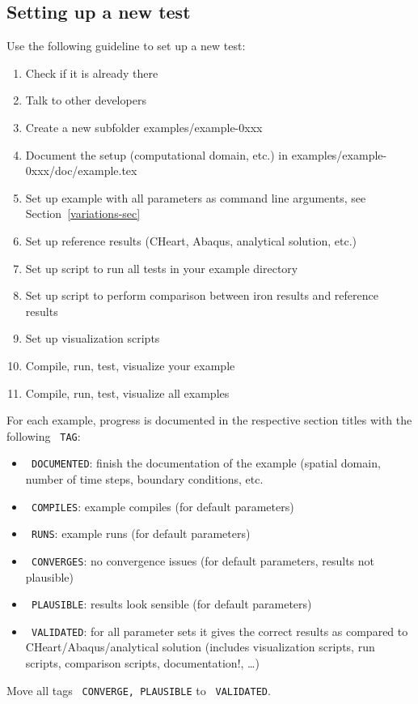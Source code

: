 \subsection{Setting up a new test}
%
Use the following guideline to set up a new test:
%
\begin{enumerate}
    \item Check if it is already there
    \item Talk to other developers
    \item Create a new subfolder examples/example-0xxx
    \item Document the setup (computational domain, etc.) in examples/example-0xxx/doc/example.tex
    \item Set up example with all parameters as command line arguments, see Section~\ref{variations-sec}
    \item Set up reference results (CHeart, Abaqus, analytical solution, etc.)
    \item Set up script to run all tests in your example directory
    \item Set up script to perform comparison between iron results and reference results
    \item Set up visualization scripts
    \item Compile, run, test, visualize your example
    \item Compile, run, test, visualize all examples
\end{enumerate}
%
For each example, progress is documented in the respective section titles
with the following \texttt{\color{red} TAG}:
%
\begin{itemize}
    \item{\texttt{\color{red} DOCUMENTED}: finish the documentation of the example (spatial domain, number of time steps, boundary conditions, etc.}
    \item{\texttt{\color{red} COMPILES}: example compiles (for default parameters)}
    \item{\texttt{\color{red} RUNS}: example runs (for default parameters)}
    \item{\texttt{\color{red} CONVERGES}: no convergence issues (for default parameters, results not plausible)}
    \item{\texttt{\color{red} PLAUSIBLE}: results look sensible (for default parameters)}
    \item{\texttt{\color{red} VALIDATED}: for all parameter sets it gives the correct results as compared to CHeart/Abaqus/analytical solution (includes visualization scripts, run scripts, comparison scripts, documentation!, \ldots)} 
\end{itemize}
%
Move all tags \texttt{\color{red} CONVERGE, PLAUSIBLE} to
\texttt{\color{red} VALIDATED}.\\

